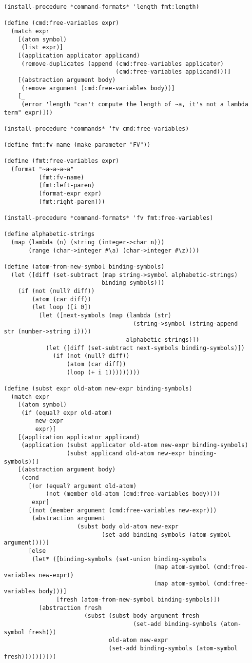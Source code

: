 \begin{lstlisting}[language=racket]
(install-procedure *command-formats* 'length fmt:length)

(define (cmd:free-variables expr)
  (match expr
    [(atom symbol)
     (list expr)]
    [(application applicator applicand)
     (remove-duplicates (append (cmd:free-variables applicator)
                                (cmd:free-variables applicand)))]
    [(abstraction argument body)
     (remove argument (cmd:free-variables body))]
    [_
     (error 'length "can't compute the length of ~a, it's not a lambda term" expr)]))

(install-procedure *commands* 'fv cmd:free-variables)

(define fmt:fv-name (make-parameter "FV"))

(define (fmt:free-variables expr)
  (format "~a~a~a~a"
          (fmt:fv-name)
          (fmt:left-paren)
          (format-expr expr)
          (fmt:right-paren)))

(install-procedure *command-formats* 'fv fmt:free-variables)

(define alphabetic-strings
  (map (lambda (n) (string (integer->char n)))
       (range (char->integer #\a) (char->integer #\z))))

(define (atom-from-new-symbol binding-symbols)
  (let ([diff (set-subtract (map string->symbol alphabetic-strings)
                            binding-symbols)])
    (if (not (null? diff))
        (atom (car diff))
        (let loop ([i 0])
          (let ([next-symbols (map (lambda (str)
                                     (string->symbol (string-append str (number->string i))))
                                   alphabetic-strings)])
            (let ([diff (set-subtract next-symbols binding-symbols)])
              (if (not (null? diff))
                  (atom (car diff))
                  (loop (+ i 1)))))))))

(define (subst expr old-atom new-expr binding-symbols)
  (match expr
    [(atom symbol)
     (if (equal? expr old-atom)
         new-expr
         expr)]
    [(application applicator applicand)
     (application (subst applicator old-atom new-expr binding-symbols)
                  (subst applicand old-atom new-expr binding-symbols))]
    [(abstraction argument body)
     (cond
       [(or (equal? argument old-atom)
            (not (member old-atom (cmd:free-variables body))))
        expr]
       [(not (member argument (cmd:free-variables new-expr)))
        (abstraction argument
                     (subst body old-atom new-expr
                            (set-add binding-symbols (atom-symbol argument))))]
       [else
        (let* ([binding-symbols (set-union binding-symbols
                                           (map atom-symbol (cmd:free-variables new-expr))
                                           (map atom-symbol (cmd:free-variables body)))]
               [fresh (atom-from-new-symbol binding-symbols)])
          (abstraction fresh
                       (subst (subst body argument fresh
                                     (set-add binding-symbols (atom-symbol fresh)))
                              old-atom new-expr
                              (set-add binding-symbols (atom-symbol fresh)))))])]))


\end{lstlisting}
